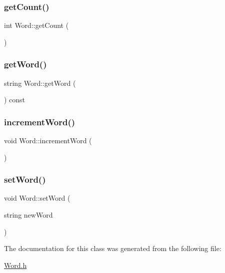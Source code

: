 \subsubsection{\texorpdfstring{get\+Count()}{getCount()}}
{\footnotesize\ttfamily int Word\+::get\+Count (\begin{DoxyParamCaption}{ }\end{DoxyParamCaption})\hspace{0.3cm}{\ttfamily [inline]}}

\mbox{\label{class_word_aba41ab97af6392f3b43399d9980be9a4}} 
\subsubsection{\texorpdfstring{get\+Word()}{getWord()}}
{\footnotesize\ttfamily string Word\+::get\+Word (\begin{DoxyParamCaption}{ }\end{DoxyParamCaption}) const\hspace{0.3cm}{\ttfamily [inline]}}

\mbox{\label{class_word_adf814d3d1db1c5864462227e4f1565b6}} 
\subsubsection{\texorpdfstring{increment\+Word()}{incrementWord()}}
{\footnotesize\ttfamily void Word\+::increment\+Word (\begin{DoxyParamCaption}{ }\end{DoxyParamCaption})\hspace{0.3cm}{\ttfamily [inline]}}

\mbox{\label{class_word_acb565f8a3aeacfb8bb9937ad570669ba}} 
\subsubsection{\texorpdfstring{set\+Word()}{setWord()}}
{\footnotesize\ttfamily void Word\+::set\+Word (\begin{DoxyParamCaption}\item[{string}]{new\+Word }\end{DoxyParamCaption})\hspace{0.3cm}{\ttfamily [inline]}}



The documentation for this class was generated from the following file\+:\begin{DoxyCompactItemize}
\item 
\hyperlink{_word_8h}{Word.\+h}\end{DoxyCompactItemize}
